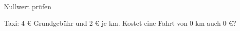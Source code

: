 \setcounter{aufgabe}{22}

\begin{aufgabe}{Nullwert prüfen}
\begin{teile}
\teil Taxi: 4 € Grundgebühr und 2 € je km. Kostet eine Fahrt von 0 km auch 0 €? \\  \\ 
\end{teile}
\end{aufgabe}

